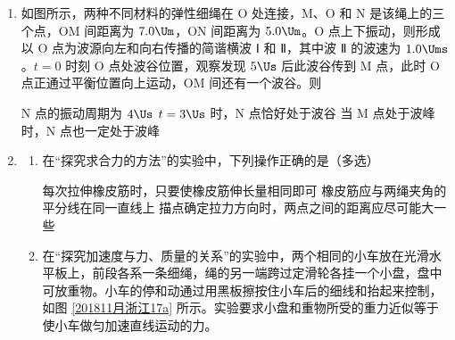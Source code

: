 \documentclass[\gkver]{gaokaozhenti}
\begin{document}
\begin{enumerate}
\item
如图所示，两种不同材料的弹性细绳在 O 处连接，M、O 和 N 是该绳上的三个点，OM 间距离为 $7.0\Um$，ON 间距离为 $5.0\Um$。O 点上下振动，则形成以 O 点为波源向左和向右传播的简谐横波 Ⅰ 和 Ⅱ，其中波 Ⅱ 的波速为 $1.0\Ums$。$t=0$ 时刻 O 点处波谷位置，观察发现 $5\Us$ 后此波谷传到 M 点，此时 O 点正通过平衡位置向上运动，OM 间还有一个波谷。则


{N 点的振动周期为 $4\Us$}
{$t=3\Us$ 时，N 点恰好处于波谷}
{当 M 点处于波峰时，N 点也一定处于波峰}

\item
\begin{enumerate}
	\item
	在“探究求合力的方法”的实验中，下列操作正确的是（多选）

	{每次拉伸橡皮筋时，只要使橡皮筋伸长量相同即可}
	{橡皮筋应与两绳夹角的平分线在同一直线上}
	{描点确定拉力方向时，两点之间的距离应尽可能大一些}
	\item
	在“探究加速度与力、质量的关系”的实验中，两个相同的小车放在光滑水平板上，前段各系一条细绳，绳的另一端跨过定滑轮各挂一个小盘，盘中可放重物。小车的停和动通过用黑板擦按住小车后的细线和抬起来控制，如图 \ref{201811月浙江17a} 所示。实验要求小盘和重物所受的重力近似等于使小车做匀加速直线运动的力。
\end{enumerate}


\end{enumerate}
\end{document}
